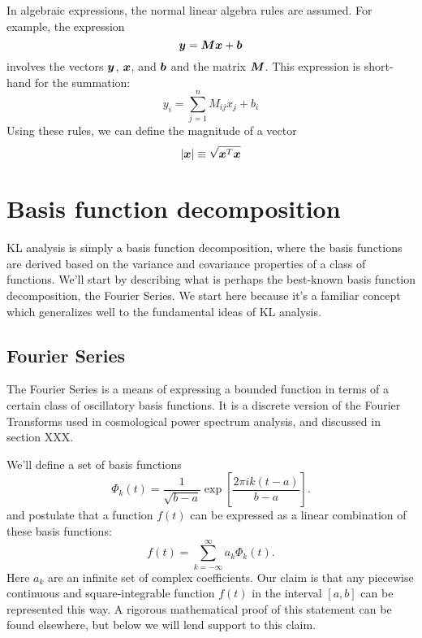 In algebraic expressions, the normal linear algebra rules are assumed.
For example, the expression 
\begin{equation}
  \boldsymbol{y} = \boldsymbol{M}\boldsymbol{x} + \boldsymbol{b}
\end{equation}
involves the vectors $\boldsymbol{y}$, $\boldsymbol{x}$, and $\boldsymbol{b}$ and the
matrix $\boldsymbol{M}$.  This expression is short-hand for the summation:
\begin{equation}
  y_i = \sum_{j=1}^{n} M_{ij} x_j + b_i
\end{equation}
Using these rules, we can define the magnitude of a vector
\begin{equation}
  |\boldsymbol{x}| \equiv \sqrt{\boldsymbol{x}^T \boldsymbol{x}}
\end{equation}

\section{Basis function decomposition}
KL analysis is simply a basis function decomposition, where the basis
functions are derived based on the variance and covariance properties
of a class of functions.  We'll start by describing what is perhaps the
best-known basis function decomposition, the Fourier Series.
We start here because it's a familiar concept which generalizes well to
the fundamental ideas of KL analysis.

\subsection{Fourier Series}
The Fourier Series is a means of expressing a bounded function in terms
of a certain class of oscillatory basis functions.  It is a discrete version
of the Fourier Transforms used in cosmological power spectrum analysis, and
discussed in section XXX.

We'll define a set of basis functions 
\begin{equation}
  \label{eq:fourier_basis}
  \Phi_k(t) = \frac{1}{\sqrt{b - a}}
  \exp\left[\frac{2\pi i k (t-a)}{b - a}\right].
\end{equation}
and postulate that a function $f(t)$ can be expressed as a linear combination
of these basis functions:
\begin{equation}
  \label{eq:fourier_1D}
  f(t) = \sum_{k=-\infty}^\infty a_k\Phi_k(t).
\end{equation}
Here $a_k$ are an infinite set of complex coefficients.  Our claim is that
any piecewise continuous and square-integrable function $f(t)$ in the
interval $[a, b]$ can be represented this way.  A rigorous mathematical proof
of this statement can be found elsewhere, but below we will lend support
to this claim.

